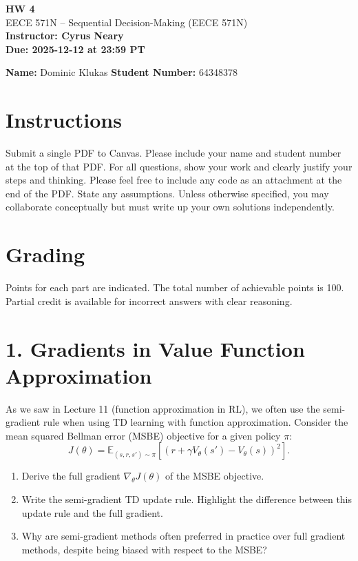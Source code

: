 \documentclass[11pt]{article}
\newcommand{\coursename}{EECE 571N -- Sequential Decision-Making (EECE 571N)}
\newcommand{\assignmenttitle}{HW 4}
\newcommand{\instructorname}{Cyrus Neary}
\newcommand{\duedate}{2025-12-12 at 23:59 PT}
\begin{document}
\begin{center}
{\Large \textbf{\assignmenttitle}}\\
\coursename\\[4pt] \textbf{Instructor: \instructorname}\\
\textbf{Due: \duedate}
\end{center}

\textbf{Name:} Dominic Klukas
\hfill
\textbf{Student Number:} 64348378

\section*{Instructions}
Submit a single PDF to Canvas. Please include your name and student number at the top of that PDF. For all questions, show your work and clearly justify your steps and thinking. Please feel free to include any code as an attachment at the end of the PDF. State any assumptions. Unless otherwise specified, you may collaborate conceptually but must write up your own solutions independently.

\section*{Grading}
Points for each part are indicated. The total number of achievable points is 100. Partial credit is available for incorrect answers with clear reasoning.

\section*{1. Gradients in Value Function Approximation}
As we saw in Lecture 11 (function approximation in RL), we often use the semi-gradient rule when using TD learning with function approximation. Consider the mean squared Bellman error (MSBE) objective for a given policy $\pi$:
\[
J(\theta) = \mathbb{E}_{(s,r,s')\sim\pi}\left[(r + \gamma V_\theta(s') - V_\theta(s))^2\right].
\]
\begin{enumerate}
    \item[(a)] Derive the full gradient $\nabla_\theta J(\theta)$ of the MSBE objective.
    \item[(b)] Write the semi-gradient TD update rule. Highlight the difference between this update rule and the full gradient.
    \item[(c)] Why are semi-gradient methods often preferred in practice over full gradient methods, despite being biased with respect to the MSBE?
\end{enumerate}
\end{document}
